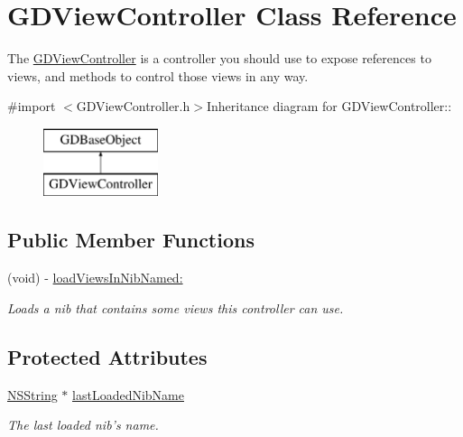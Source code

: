 \hypertarget{interface_g_d_view_controller}{
\section{GDViewController Class Reference}
\label{interface_g_d_view_controller}
}


The \hyperlink{interface_g_d_view_controller}{GDViewController} is a controller you should use to expose references to views, and methods to control those views in any way.  


{\ttfamily \#import $<$GDViewController.h$>$}Inheritance diagram for GDViewController::\begin{figure}[H]
\begin{center}
\leavevmode
\includegraphics[height=2cm]{interface_g_d_view_controller}
\end{center}
\end{figure}
\subsection*{Public Member Functions}
\begin{DoxyCompactItemize}
\item 
(void) -\/ \hyperlink{interface_g_d_view_controller_a03b39c29a143a38b171dcf311384e4df}{loadViewsInNibNamed:}
\begin{DoxyCompactList}\small\item\em Loads a nib that contains some views this controller can use. \item\end{DoxyCompactList}\end{DoxyCompactItemize}
\subsection*{Protected Attributes}
\begin{DoxyCompactItemize}
\item 
\hyperlink{class_n_s_string}{NSString} $\ast$ \hyperlink{interface_g_d_view_controller_a46123f01096710058753b5e97c70e6ab}{lastLoadedNibName}
\begin{DoxyCompactList}\small\item\em The last loaded nib's name. \item\end{DoxyCompactList}\end{DoxyCompactItemize}


